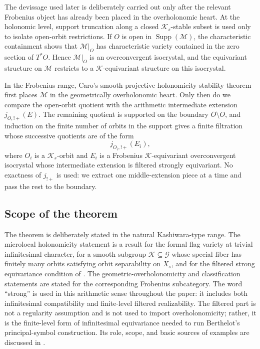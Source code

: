 \documentclass[11pt]{amsart}
\theoremstyle{plain}
\theoremstyle{definition}
\theoremstyle{remark}
\begin{document}
The devissage used later is deliberately carried out only after the relevant
Frobenius object has already been placed in the overholonomic heart.  At the
holonomic level, support truncation along a closed \(\mathcal K_s\)-stable subset
is used only to isolate open-orbit restrictions.  If \(O\) is open in
\(\operatorname{Supp}(\mathcal M)\), the characteristic containment shows that
\(\mathcal M|_O\) has characteristic variety contained in the zero section of
\(T^*O\).  Hence \(\mathcal M|_O\) is an overconvergent isocrystal, and the
equivariant structure on \(\mathcal M\) restricts to a \(\mathcal K\)-equivariant
structure on this isocrystal.

In the Frobenius range, Caro's smooth-projective holonomicity-stability theorem first places \(\mathcal M\) in the
geometrically overholonomic heart.  Only then do we compare the open-orbit
quotient with the arithmetic intermediate extension \(j_{O,!+}(E)\).  The
remaining quotient is supported on the boundary \(\overline O\setminus O\), and
induction on the finite number of orbits in the support gives a finite
filtration whose successive quotients are of the form
\[
  j_{O_i,!+}(E_i),
\]
where \(O_i\) is a \(\mathcal K_s\)-orbit and \(E_i\) is a Frobenius
\(\mathcal K\)-equivariant overconvergent isocrystal whose intermediate
extension is filtered strongly equivariant.  No exactness of \(j_{!+}\) is used:
we extract one middle-extension piece at a time and pass the rest to the
boundary.

\subsection*{Scope of the theorem}

The theorem is deliberately stated in the natural Kashiwara-type range.  The
microlocal holonomicity statement is a result for the formal flag variety at
trivial infinitesimal character, for a smooth subgroup
\(\mathcal K\subseteq\mathcal G\) whose special fiber has finitely many orbits satisfying orbit separability
on \(X_s\), and for the filtered strong equivariance condition of
.  The geometric-overholonomicity and
classification statements are stated for the corresponding Frobenius subcategory.  The word ``strong'' is used in this arithmetic
sense throughout the paper: it includes both infinitesimal compatibility and
finite-level filtered realizability.  The filtered part is not a regularity
assumption and is not used to import overholonomicity; rather, it is the
finite-level form of infinitesimal equivariance needed to run Berthelot's
principal-symbol construction.  Its role, scope, and basic sources of examples
are discussed in .
\end{document}
